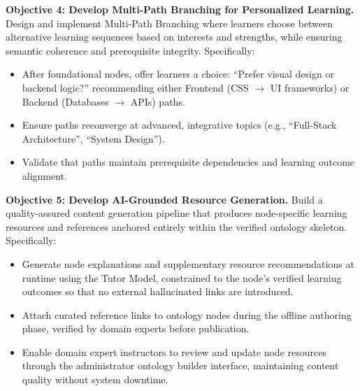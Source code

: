 \textbf{Objective 4: Develop Multi-Path Branching for Personalized Learning.} Design and implement Multi-Path Branching where learners choose between alternative learning sequences based on interests and strengths, while ensuring semantic coherence and prerequisite integrity. Specifically:
\begin{itemize}
    \item After foundational nodes, offer learners a choice: \enquote{Prefer visual design or backend logic?} recommending either Frontend (CSS $\rightarrow$ UI frameworks) or Backend (Databases $\rightarrow$ APIs) paths.
    \item Ensure paths reconverge at advanced, integrative topics (e.g., \enquote{Full-Stack Architecture}, \enquote{System Design}).
    \item Validate that paths maintain prerequisite dependencies and learning outcome alignment.
\end{itemize}

\textbf{Objective 5: Develop AI-Grounded Resource Generation.} Build a quality-assured content generation pipeline that produces node-specific learning resources and references anchored entirely within the verified ontology skeleton. Specifically:
\begin{itemize}
    \item Generate node explanations and supplementary resource recommendations at runtime using the Tutor Model, constrained to the node's verified learning outcomes so that no external hallucinated links are introduced.
    \item Attach curated reference links to ontology nodes during the offline authoring phase, verified by domain experts before publication.
    \item Enable domain expert instructors to review and update node resources through the administrator ontology builder interface, maintaining content quality without system downtime.
\end{itemize}

